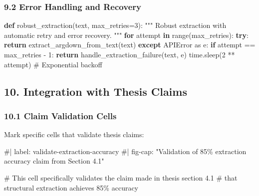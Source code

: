 \documentclass[
  11pt,
  letterpaper,
]{book}
\newenvironment{Shaded}{\begin{snugshade}}{\end{snugshade}}
\newcommand{\BuiltInTok}[1]{\textcolor[rgb]{0.00,0.23,0.31}{#1}}
\newcommand{\CommentTok}[1]{\textcolor[rgb]{0.37,0.37,0.37}{#1}}
\newcommand{\ControlFlowTok}[1]{\textcolor[rgb]{0.00,0.23,0.31}{\textbf{#1}}}
\newcommand{\DecValTok}[1]{\textcolor[rgb]{0.68,0.00,0.00}{#1}}
\newcommand{\ImportTok}[1]{\textcolor[rgb]{0.00,0.46,0.62}{#1}}
\newcommand{\KeywordTok}[1]{\textcolor[rgb]{0.00,0.23,0.31}{\textbf{#1}}}
\newcommand{\NormalTok}[1]{\textcolor[rgb]{0.00,0.23,0.31}{#1}}
\newcommand{\OperatorTok}[1]{\textcolor[rgb]{0.37,0.37,0.37}{#1}}
\begin{document}
\subsubsection{9.2 Error Handling and
Recovery}\label{error-handling-and-recovery}

\begin{Shaded}
\begin{Highlighting}[]
\KeywordTok{def}\NormalTok{ robust\_extraction(text, max\_retries}\OperatorTok{=}\DecValTok{3}\NormalTok{):}
    \CommentTok{"""}
\CommentTok{    Robust extraction with automatic retry and error recovery.}
\CommentTok{    """}
    \ControlFlowTok{for}\NormalTok{ attempt }\KeywordTok{in} \BuiltInTok{range}\NormalTok{(max\_retries):}
        \ControlFlowTok{try}\NormalTok{:}
            \ControlFlowTok{return}\NormalTok{ extract\_argdown\_from\_text(text)}
        \ControlFlowTok{except}\NormalTok{ APIError }\ImportTok{as}\NormalTok{ e:}
            \ControlFlowTok{if}\NormalTok{ attempt }\OperatorTok{==}\NormalTok{ max\_retries }\OperatorTok{{-}} \DecValTok{1}\NormalTok{:}
                \ControlFlowTok{return}\NormalTok{ handle\_extraction\_failure(text, e)}
\NormalTok{            time.sleep(}\DecValTok{2} \OperatorTok{**}\NormalTok{ attempt)  }\CommentTok{\# Exponential backoff}
\end{Highlighting}
\end{Shaded}

\subsection{10. Integration with Thesis
Claims}\label{integration-with-thesis-claims}

\subsubsection{10.1 Claim Validation
Cells}\label{claim-validation-cells}

Mark specific cells that validate thesis claims:

\begin{Shaded}
\begin{Highlighting}[]
\CommentTok{\#| label: validate{-}extraction{-}accuracy}
\CommentTok{\#| fig{-}cap: "Validation of 85\% extraction accuracy claim from Section 4.1"}

\CommentTok{\# This cell specifically validates the claim made in thesis section 4.1}
\CommentTok{\# that structural extraction achieves 85\% accuracy}
\end{Highlighting}
\end{Shaded}
\end{document}

